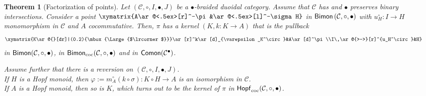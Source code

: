 \documentclass[nosumlimits,twoside]{amsart}
\makeatletter
\newtheorem{theorem}{\sc Theorem}[section]
\theoremstyle{definition}
\theoremstyle{remark}
\newcommand{\rd}[1]{{\color{red}{#1}}}
\def\pulb{\ar@{}[dr]|(0.2){\mbox{\Large{$\lrcorner$}}}}
\newcommand{\Cc}{\mathcal{C}}
\def\Bimon{{\sf Bimon}}
\def\Comon{{\sf Comon}}
\def\cHopfmon{{\sf Hopf}_{\mathrm{coc}}}
\def\cBimon{{\sf Bimon}_{\mathrm{coc}}}
\makeatother
\begin{document}
\begin{theorem}[Factorization of points]\label{thm:main}
Let $\left( \mathcal{C},\circ ,I,\bullet ,J\right) $ be a $\bullet $-braided duoidal category. Assume that $\mathcal{C}$ has and $\bullet$ preserves binary intersections. Consider a point $\xymatrix{A\ar@<.5ex>[r]^-\pi&\ar@<.5ex>[l]^-\sigma H}$ in $\Bimon \left(\Cc,\circ,\bullet\right) $
with $u_{H}^{\circ }:I\rightarrow H$ monomorphism in $\Cc$ and $A$ cocommutative. Then, $\pi $
has a kernel $\left( K,k:K\rightarrow A\right) $ that is the pullback
\begin{equation*}
\xymatrix{K\pulb\ar[r]^k\ar[d]_{\varepsilon_K^\circ}&A\ar[d]^\pi\\I\,\ar@{>->}[r]^{u_H^\circ}&H}
\end{equation*}%
 in $\Bimon(\Cc,\circ,\bullet)$, in  $\cBimon(\Cc,\circ,\bullet)$ and  in $\Comon(\Cc^{\bullet }) $.

Assume further that there is a reversion on $\left( \mathcal{C}%
,\circ ,I,\bullet ,J\right) $.\\ 
If $H$ is a Hopf monoid, then $\varphi :=m_{A}^{\circ }\left( k\circ \sigma \right)
:K\circ H\rightarrow A$ is an isomorphism in $\Cc$. \\
If $A$ is a Hopf monoid, then so is $K$, which turns out to be the kernel of $\pi$ in $\cHopfmon(\Cc,\circ,\bullet)$.
\end{theorem}
\end{document}

